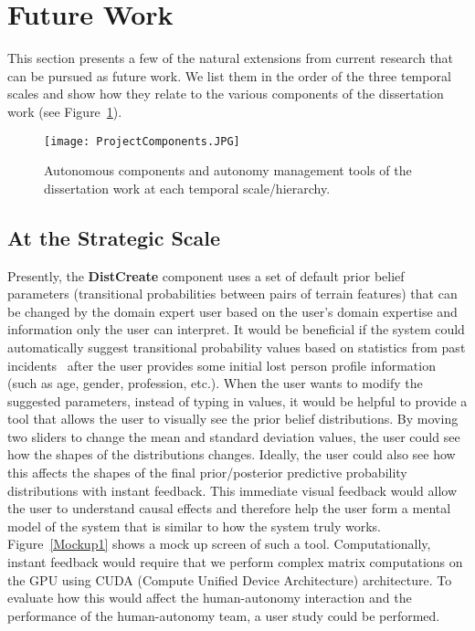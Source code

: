 \section{Future Work}
\label{futurework}

This section presents a few of the natural extensions from current research that can be pursued as future work. We list them in the order of the three temporal scales and show how they relate to the various components of the dissertation work (see Figure~\ref{ProjectComponents2}).

\begin{figure}
\centering
\texttt{[image: ProjectComponents.JPG]}
\caption{Autonomous components and autonomy management tools of the dissertation work at each temporal scale/hierarchy.}
\label{ProjectComponents2}
\end{figure}

\subsection{At the Strategic Scale}

Presently, the \textbf{DistCreate} component uses a set of default prior belief parameters (transitional probabilities between pairs of terrain features) that can be changed by the domain expert user based on the user's domain expertise and information only the user can interpret. It would be beneficial if the system could automatically suggest transitional probability values based on statistics from past incidents~\cite{Koester2008Lost} after the user provides some initial lost person profile information (such as age, gender, profession, etc.). When the user wants to modify the suggested parameters, instead of typing in values, it would be helpful to provide a tool that allows the user to visually see the prior belief distributions. By moving two sliders to change the mean and standard deviation values, the user could see how the shapes of the distributions changes. Ideally, the user could also see how this affects the shapes of the final prior/posterior predictive probability distributions with instant feedback. This immediate visual feedback would allow the user to understand causal effects and therefore help the user form a mental model of the system that is similar to how the system truly works. Figure~\ref{Mockup1} shows a mock up screen of such a tool. Computationally, instant feedback would require that we perform complex matrix computations on the GPU using CUDA (Compute Unified Device Architecture) architecture. To evaluate how this would affect the human-autonomy interaction and the performance of the human-autonomy team, a user study could be performed.

